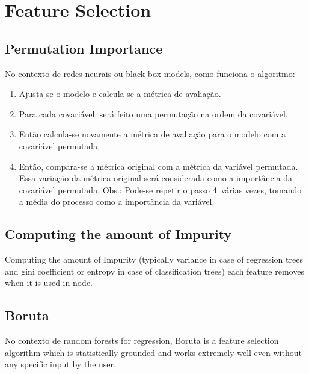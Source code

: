 \section{Feature Selection}
\subsection{Permutation Importance}
No contexto de redes neurais ou black-box models, como funciona o algoritmo:

\begin{enumerate}
\item Ajusta-se o modelo e calcula-se a métrica de avaliação.
\item Para cada covariável, será feito uma permutação na ordem da covariável.
\item Então calcula-se novamente a métrica de avaliação para o modelo com a covariável permutada.
\item Então, compara-se a métrica original com a métrica da variável permutada. Essa variação da métrica original será considerada como a importância da covariável permutada. Obs.: Pode-se repetir o passo 4 várias vezes, tomando a média do processo como a importância da variável.
\end{enumerate}

\subsection{Computing the amount of Impurity}
Computing the amount of Impurity (typically variance in case of regression trees and gini coefficient or entropy in case of classification trees) each feature removes when it is used in node.

\subsection{Boruta}
No contexto de random forests for regression, Boruta is a feature selection algorithm which is statistically grounded and works extremely well even without any specific input by the user.
    
